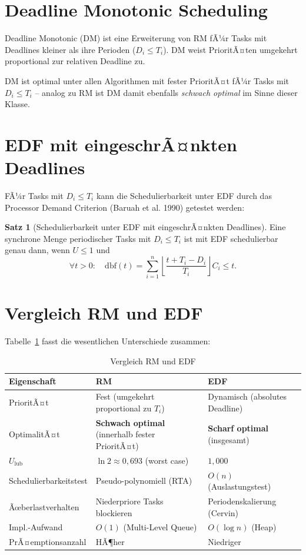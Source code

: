 ﻿\documentclass[a4paper,12pt]{report}
\theoremstyle{definition}
\newtheorem{satz}{Satz}[chapter]
\begin{document}
\section{Deadline Monotonic Scheduling}

Deadline Monotonic (DM) ist eine Erweiterung von RM fÃ¼r Tasks mit Deadlines
kleiner als ihre Perioden ($D_i \leq T_i$). DM weist PrioritÃ¤ten umgekehrt
proportional zur relativen Deadline zu.

DM ist optimal unter allen Algorithmen mit fester PrioritÃ¤t fÃ¼r Tasks mit
$D_i \leq T_i$ -- analog zu RM ist DM damit ebenfalls \emph{schwach optimal}
im Sinne dieser Klasse.

\section{EDF mit eingeschrÃ¤nkten Deadlines}

FÃ¼r Tasks mit $D_i \leq T_i$ kann die Schedulierbarkeit unter EDF durch das
Processor Demand Criterion (Baruah et al. 1990) getestet werden:

\begin{satz}[Schedulierbarkeit unter EDF mit eingeschrÃ¤nkten Deadlines]
	Eine synchrone Menge periodischer Tasks mit $D_i \leq T_i$ ist mit EDF
	schedulierbar genau dann, wenn $U \leq 1$ und
	\[
		\forall t > 0: \quad \mathrm{dbf}(t) = \sum_{i=1}^{n} \left\lfloor \frac{t + T_i - D_i}{T_i} \right\rfloor C_i \leq t.
	\]
\end{satz}

\section{Vergleich RM und EDF}

Tabelle~\ref{tab:rm_edf} fasst die wesentlichen Unterschiede zusammen:

\begin{table}[H]
	\centering
	\caption{Vergleich RM und EDF}
	\label{tab:rm_edf}
	\begin{tabular}{p{4cm}p{5cm}p{5cm}}
		\toprule
		\textbf{Eigenschaft} & \textbf{RM} & \textbf{EDF} \\
		\midrule
		PrioritÃ¤t            & Fest (umgekehrt proportional zu $T_i$) & Dynamisch (absolutes Deadline) \\
		OptimalitÃ¤t          & \textbf{Schwach optimal} (innerhalb fester PrioritÃ¤t) & \textbf{Scharf optimal} (insgesamt) \\
		$U_{\text{lub}}$     & $\ln 2 \approx 0{,}693$ (worst case) & $1{,}000$ \\
		Schedulierbarkeitstest & Pseudo-polynomiell (RTA) & $O(n)$ (Auslastungstest) \\
		Ãœberlastverhalten    & Niederpriore Tasks blockieren & Periodenskalierung (Cervin) \\
		Impl.-Aufwand & $O(1)$ (Multi-Level Queue) & $O(\log n)$ (Heap) \\
		PrÃ¤emptionsanzahl    & HÃ¶her & Niedriger \\
		\bottomrule
	\end{tabular}
\end{table}
\end{document}
